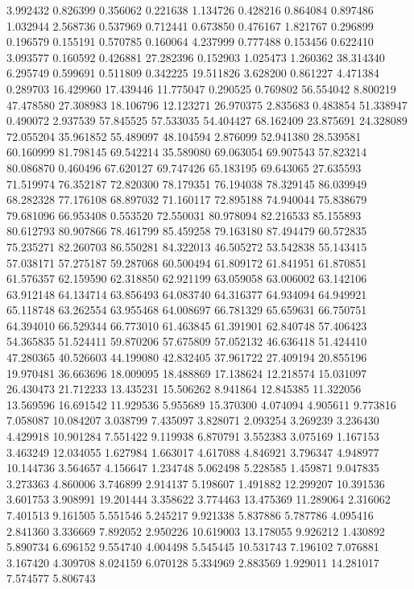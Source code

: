 3.992432
0.826399
0.356062
0.221638
1.134726
0.428216
0.864084
0.897486
1.032944
2.568736
0.537969
0.712441
0.673850
0.476167
1.821767
0.296899
0.196579
0.155191
0.570785
0.160064
4.237999
0.777488
0.153456
0.622410
3.093577
0.160592
0.426881
27.282396
0.152903
1.025473
1.260362
38.314340
6.295749
0.599691
0.511809
0.342225
19.511826
3.628200
0.861227
4.471384
0.289703
16.429960
17.439446
11.775047
0.290525
0.769802
56.554042
8.800219
47.478580
27.308983
18.106796
12.123271
26.970375
2.835683
0.483854
51.338947
0.490072
2.937539
57.845525
57.533035
54.404427
68.162409
23.875691
24.328089
72.055204
35.961852
55.489097
48.104594
2.876099
52.941380
28.539581
60.160999
81.798145
69.542214
35.589080
69.063054
69.907543
57.823214
80.086870
0.460496
67.620127
69.747426
65.183195
69.643065
27.635593
71.519974
76.352187
72.820300
78.179351
76.194038
78.329145
86.039949
68.282328
77.176108
68.897032
71.160117
72.895188
74.940044
75.838679
79.681096
66.953408
0.553520
72.550031
80.978094
82.216533
85.155893
80.612793
80.907866
78.461799
85.459258
79.163180
87.494479
60.572835
75.235271
82.260703
86.550281
84.322013
46.505272
53.542838
55.143415
57.038171
57.275187
59.287068
60.500494
61.809172
61.841951
61.870851
61.576357
62.159590
62.318850
62.921199
63.059058
63.006002
63.142106
63.912148
64.134714
63.856493
64.083740
64.316377
64.934094
64.949921
65.118748
63.262554
63.955468
64.008697
66.781329
65.659631
66.750751
64.394010
66.529344
66.773010
61.463845
61.391901
62.840748
57.406423
54.365835
51.524411
59.870206
57.675809
57.052132
46.636418
51.424410
47.280365
40.526603
44.199080
42.832405
37.961722
27.409194
20.855196
19.970481
36.663696
18.009095
18.488869
17.138624
12.218574
15.031097
26.430473
21.712233
13.435231
15.506262
8.941864
12.845385
11.322056
13.569596
16.691542
11.929536
5.955689
15.370300
4.074094
4.905611
9.773816
7.058087
10.084207
3.038799
7.435097
3.828071
2.093254
3.269239
3.236430
4.429918
10.901284
7.551422
9.119938
6.870791
3.552383
3.075169
1.167153
3.463249
12.034055
1.627984
1.663017
4.617088
4.846921
3.796347
4.948977
10.144736
3.564657
4.156647
1.234748
5.062498
5.228585
1.459871
9.047835
3.273363
4.860006
3.746899
2.914137
5.198607
1.491882
12.299207
10.391536
3.601753
3.908991
19.201444
3.358622
3.774463
13.475369
11.289064
2.316062
7.401513
9.161505
5.551546
5.245217
9.921338
5.837886
5.787786
4.095416
2.841360
3.336669
7.892052
2.950226
10.619003
13.178055
9.926212
1.430892
5.890734
6.696152
9.554740
4.004498
5.545445
10.531743
7.196102
7.076881
3.167420
4.309708
8.024159
6.070128
5.334969
2.883569
1.929011
14.281017
7.574577
5.806743
